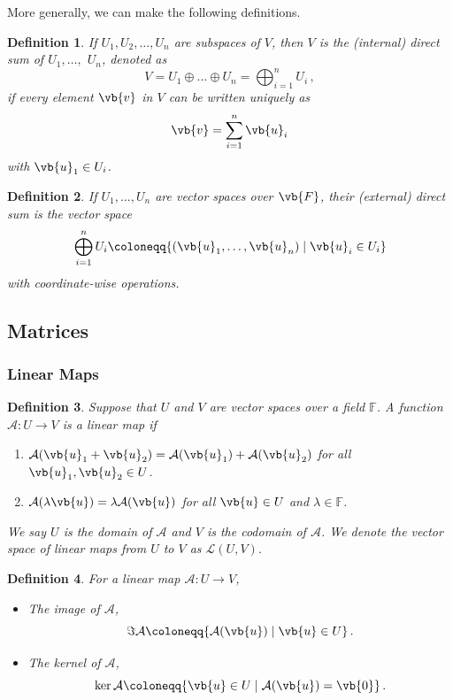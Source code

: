 \documentclass{article}
\theoremstyle{plain}\theoremheaderfont{\normalfont\itshape}\theorembodyfont{\rmfamily}\theoremseparator{.}\newtheorem*{rem}{Remark}\newtheorem*{ex}{Example}\newtheorem*{proof}{Proof}\newtheorem*{altp}{Alternative proof}
\theoremstyle{plain}\theoremheaderfont{\normalfont\bfseries}\theorembodyfont{\rmfamily}\theoremseparator{.}\newtheorem{thm}{Theorem}[section]\newtheorem{lem}[thm]{Lemma}\newtheorem{prop}[thm]{Proposition}\newtheorem*{cor}{Corollary}\newtheorem{defn}[thm]{Definition}\newtheorem{clm}[thm]{Claim}\newtheorem{clminproof}{Claim}
\theoremstyle{break}\theoremheaderfont{\normalfont\itshape}\theorembodyfont{\rmfamily}\theoremseparator{.\medskip}\newtheorem*{proofskip}{Proof}\newtheorem*{exs}{Examples}\newtheorem*{rems}{Remarks}
\theoremstyle{break}\theoremheaderfont{\normalfont\bfseries}\theorembodyfont{\rmfamily}\theoremseparator{.\medskip}\newtheorem{lemskip}[thm]{Lemma}\newtheorem{defnskip}[thm]{Definition}\newtheorem{propskip}[thm]{Proposition}\newtheorem{thmskip}[thm]{Theorem}
\numberwithin{equation}{section}
\begin{document}
	More generally, we can make the following definitions.

	\begin{defn}
		If \(U_1, U_2,\dots, U_n\) are subspaces of \(V\), then \(V\) is the \textit{(internal) direct sum} of \(U_1,\dots,\) \(U_n\), denoted as
		\[V=U_1\oplus\dots\oplus U_n =\bigoplus_{i=1}^{n}U_i\,,\]
		if every element \(\vb{v}\) in \(V\) can be written uniquely as
		\[\vb{v}=\sum_{i=1}^{n}\vb{u}_i\]
		with \(\vb{u}_1\in U_i\).
	\end{defn}
	\begin{defn}
		If \(U_1,\dots,U_n\) are vector spaces over \(\vb{F}\), their \textit{(external) direct sum} is the vector space
		\[\bigoplus_{i=1}^{n}U_i\coloneqq\{(\vb{u}_1,\dots,\vb{u}_n)\mid \vb{u}_i\in U_i\}\]
		with coordinate-wise operations.
	\end{defn}

	\subsection{Matrices}
	\subsubsection{Linear Maps}
	\begin{defn}
		Suppose that \(U\) and \(V\) are vector spaces over a field \(\mathbb{F}\). A function
		\(\mathcal{A}: U\to V\) is a \textit{linear map} if
		\begin{enumerate}[topsep=0pt]
			\item[(i)] \(\mathcal{A}(\vb{u}_1+\vb{u}_2)=\mathcal{A}(\vb{u}_1)+\mathcal{A}(\vb{u}_2)\) for all \(\vb{u}_1,\vb{u}_2\in U\).
			\item[(ii)] \(\mathcal{A}(\lambda\vb{u})=\lambda\mathcal{A}(\vb{u})\) for all \(\vb{u}\in U\) and \(\lambda\in\mathbb{F}\).
		\end{enumerate}
		We say \(U\) is the \textit{domain} of \(\mathcal{A}\) and \(V\) is the \textit{codomain} of \(\mathcal{A}\). We denote the vector space of linear maps from \(U\) to \(V\) as \(\mathcal{L}(U,V)\).
	\end{defn}

	\begin{defn}
		For a linear map \(\mathcal{A}:U\to V\),
		\begin{itemize}[topsep=0pt]
			\item The \textit{image} of \(\mathcal{A}\),
			\[\Im\mathcal{A}\coloneqq\{\mathcal{A}(\vb{u})\mid \vb{u}\in U\}\,.\]
			\item The \textit{kernel} of \(\mathcal{A}\),
			\[\ker\mathcal{A}\coloneqq\{\vb{u}\in U\mid \mathcal{A}(\vb{u})=\vb{0}\}\,.\]
		\end{itemize}
	\end{defn}
	
\end{document}
